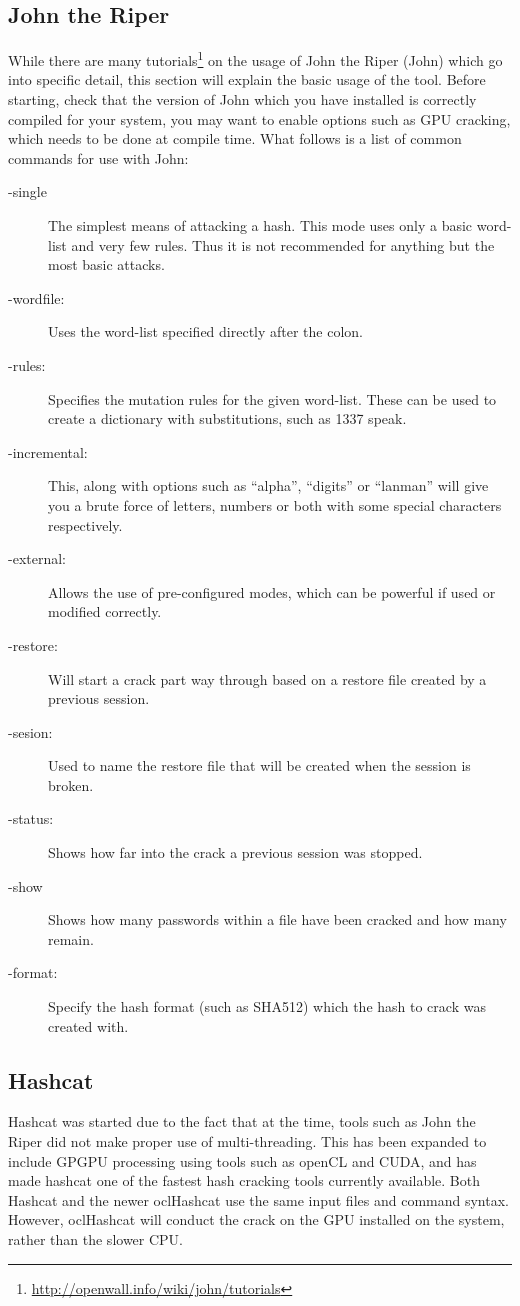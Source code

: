 		\subsection{John the Riper}
			While there are many tutorials\footnote{\url{http://openwall.info/wiki/john/tutorials}} on the usage of John the Riper (John) which go into specific detail, this section will explain the basic usage of the tool. 
			Before starting, check that the version of John which you have installed is correctly compiled for your system, you may want to enable options such as GPU cracking, which needs to be done at compile time. 
			What follows is a list of common commands for use with John:
			\begin{description}
				\item[-single]
					The simplest means of attacking a hash. 
					This mode uses only a basic word-list and very few rules. 
					Thus it is not recommended for anything but the most basic attacks. 
				\item[-wordfile:]
					Uses the word-list specified directly after the colon. 
				\item[-rules:]
					Specifies the mutation rules for the given word-list. 
					These can be used to create a dictionary with substitutions, such as 1337 speak. 
				\item[-incremental:]
					This, along with options such as ``alpha'', ``digits'' or ``lanman'' will give you a brute force of letters, numbers or both with some special characters respectively. 
				\item[-external:]
					Allows the use of pre-configured modes, which can be powerful if used or modified correctly. 
				\item[-restore:]
					Will start a crack part way through based on a restore file created by a previous session. 
				\item[-sesion:]
					Used to name the restore file that will be created when the session is broken. 
				\item[-status:]
					Shows how far into the crack a previous session was stopped. 
				\item[-show]
					Shows how many passwords within a file have been cracked and how many remain. 
				\item[-format:]
					Specify the hash format (such as SHA512) which the hash to crack was created with. 
			\end{description}
			
		\subsection{Hashcat}
			Hashcat was started due to the fact that at the time, tools such as John the Riper did not make proper use of multi-threading. 
			This has been expanded to include GPGPU processing using tools such as openCL and CUDA, and has made hashcat one of the fastest hash cracking tools currently available. 
			Both Hashcat and the newer oclHashcat use the same input files and command syntax. 
			However, oclHashcat will conduct the crack on the GPU installed on the system, rather than the slower CPU. 

